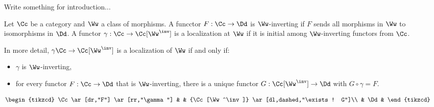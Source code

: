 

Write something for introduction...

Let $\Cc$ be a category and $\Ww$ a class of morphisms. A funcctor $F:\Cc\to\Dd$ is $\Ww$-inverting if $F$ sends all morphisms in $\Ww$ to isomorphisms in $\Dd$. A functor $\gamma:\Cc\to\Cc[\Ww^\inv]$ is a localization at $\Ww$ if it is initial among $\Ww$-inverting functors from $\Cc$.

In more detail, $\gamma\Cc\to\Cc[\Ww^\inv]$ is a localization of $\Ww$ if and only if:
\begin{itemize}[label={-}]
    \item $\gamma$ is $\Ww$-inverting,
    \item for every functor $F:\Cc\to\Dd$ that is $\Ww$-inverting, there is a unique functor $G:\Cc[\Ww^\inv]\to\Dd$ with $G\circ\gamma=F$.
\end{itemize}
\[
\begin{tikzcd}
\Cc \ar[dr,"F"] \ar[rr,"\gamma"] & & {\Cc[\Ww^\inv]} \ar[dl,dashed,"\exists! G"]\\
& \Dd &
\end{tikzcd}
\]

